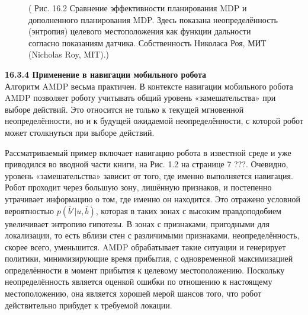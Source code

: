 \documentclass[10pt,a4paper]{article}
\begin{document}
\begin{figure}[H]
	\caption{ ( Рис. 16.2 Сравнение эффективности планирования MDP и дополненного планирования MDP. Здесь показана неопределённость (энтропия) целевого местоположения как функции дальности согласно показаниям датчика. Собственность Николаса Роя, МИТ (Nicholas Roy, MIT).) }
	\label{fig:162orig}
\end{figure}

\textbf{16.3.4	Применение в навигации мобильного робота}\\

Алгоритм AMDP весьма практичен. В контексте навигации мобильного робота AMDP позволяет роботу учитывать общий уровень «замешательства» при выборе действий. Это относится не только к текущей мгновенной неопределённости, но и к будущей ожидаемой неопределённости, с которой робот может столкнуться при выборе действий.

Рассматриваемый пример включает навигацию робота в известной среде и уже приводился во вводной части книги, на Рис. 1.2 на странице 7 ???. Очевидно, уровень «замешательства» зависит от того, где именно выполняется навигация. Робот проходит через большую зону, лишённую признаков, и постепенно утрачивает информацию о том, где именно он находится. Это отражено условной вероятностью $p(\bar{b}' | u, \bar{b})$, которая в таких зонах с высоким правдоподобием увеличивает энтропию гипотезы. В зонах с признаками, пригодными для локализации, то есть вблизи стен с различимыми признаками, неопределённость, скорее всего, уменьшится. AMDP обрабатывает такие ситуации и генерирует политики, минимизирующие время прибытия, с одновременной максимизацией определённости в момент прибытия к целевому местоположению. Поскольку неопределённость является оценкой ошибки по отношению к настоящему местоположению, она является хорошей мерой шансов того, что робот действительно прибудет к требуемой локации. 
\end{document}
